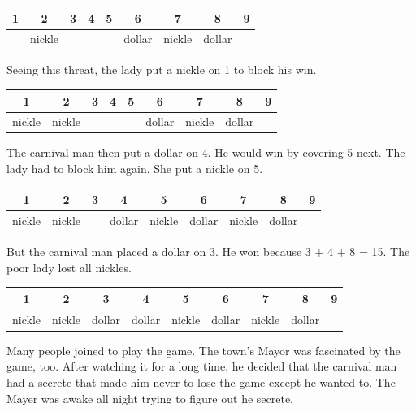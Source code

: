 \documentclass[UTF8]{article}
\begin{document}
\vspace{5mm}
\begin{tabular}{|c|c|c|c|c|c|c|c|c|}
\hline
1 & 2 & 3 & 4 & 5 & 6 & 7 & 8 & 9 \\
\hline
  & nickle  &   &   &   & dollar  & nickle & dollar & \\
\hline
\end{tabular}
\vspace{5mm}

Seeing this threat, the lady put a nickle on 1 to block his win.

\vspace{5mm}
\begin{tabular}{|c|c|c|c|c|c|c|c|c|}
\hline
1 & 2 & 3 & 4 & 5 & 6 & 7 & 8 & 9 \\
\hline
nickle  & nickle  &   &   &   & dollar & nickle & dollar & \\
\hline
\end{tabular}
\vspace{5mm}

The carnival man then put a dollar on 4. He would win by covering 5 next. The lady had to block him again. She put a nickle on 5.

\vspace{5mm}
\begin{tabular}{|c|c|c|c|c|c|c|c|c|}
\hline
1 & 2 & 3 & 4 & 5 & 6 & 7 & 8 & 9 \\
\hline
nickle  & nickle  &   & dollar  & nickle  & dollar  & nickle & dollar & \\
\hline
\end{tabular}
\vspace{5mm}

But the carnival man placed a dollar on 3. He won because 3 + 4 + 8 = 15. The poor lady lost all nickles.

\vspace{5mm}
\begin{tabular}{|c|c|c|c|c|c|c|c|c|}
\hline
1 & 2 & 3 & 4 & 5 & 6 & 7 & 8 & 9 \\
\hline
nickle  & nickle  & dollar  & dollar  & nickle  & dollar  & nickle & dollar & \\
\hline
\end{tabular}
\vspace{5mm}

Many people joined to play the game. The town's Mayor was fascinated by the game, too. After watching it for a long time, he decided that the carnival man had a secrete that made him never to lose the game except he wanted to. The Mayer was awake all night trying to figure out he secrete.
\end{document}
